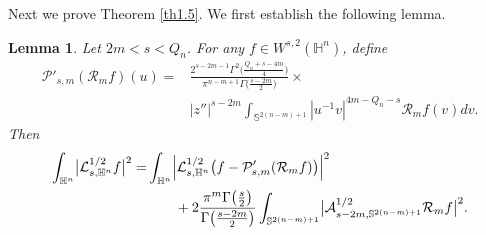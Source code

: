 \documentclass[12pt,reqno]{amsart}%
\theoremstyle{plain}
\newtheorem{lemma}{Lemma}[section]
\numberwithin{equation}{section}
\begin{document}
Next we prove Theorem \ref{th1.5}. We first establish the following lemma.
\begin{lemma}\label{lm4.4}
Let \(2m < s < Q_n\). For any \(f \in W^{s,2}(\mathbb{H}^{n})\), define
\begin{align}\nonumber
\mathcal{P}'_{s,m}(\mathcal{R}_{m}f)(u)=&\frac{2^{s-2m-1}\Gamma^{2}\bigl(\frac{Q_n+s-4m}{4}\bigr)}
{\pi^{n-m+1}\Gamma\bigl(\frac{s-2m}{2}\bigr)}\times\\
\label{3.11}
&
|z''|^{s-2m}\int_{\mathbb{S}^{2(n-m)+1}} |u^{-1}v|^{4m-Q_n-s}\mathcal{R}_{m}f(v)dv .
\end{align}
Then
\begin{align}\nonumber
\int_{\mathbb{H}^{n}}\bigl|\mathcal{L}_{s,\mathbb{H}^{n}}^{1/2}f\bigr|^{2}
=& \int_{\mathbb{H}^{n}}\Bigl|\mathcal{L}_{s,\mathbb{H}^{n}}^{1/2}\bigl(f-
\mathcal{P}'_{s,m}(\mathcal{R}_{m}f)\bigr)\Bigr|^{2} \\
\label{3.6}
&\qquad + 2\frac{\pi^{m}\Gamma\bigl(\frac{s}{2}\bigr)}{\Gamma\bigl(\frac{s-2m}{2}\bigr)}
\int_{\mathbb{S}^{2(n-m)+1}}\bigl|\mathcal{A}_{s-2m,\mathbb{S}^{2(n-m)+1}}^{1/2}
\mathcal{R}_{m}f\bigr|^{2}.
\end{align}
\end{lemma}
\end{document}
